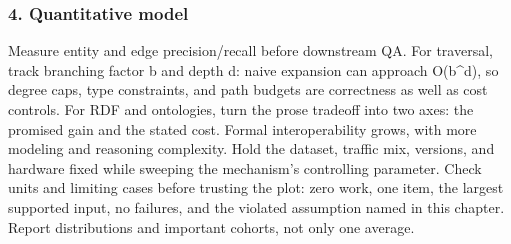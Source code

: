 \subsubsection*{4. Quantitative model}
Measure entity and edge precision/recall before downstream QA. For traversal, track branching factor b and depth d: naive expansion can approach O(b\textasciicircum{}d), so degree caps, type constraints, and path budgets are correctness as well as cost controls.
For RDF and ontologies, turn the prose tradeoff into two axes: the promised gain and the stated cost. Formal interoperability grows, with more modeling and reasoning complexity. Hold the dataset, traffic mix, versions, and hardware fixed while sweeping the mechanism's controlling parameter.
Check units and limiting cases before trusting the plot: zero work, one item, the largest supported input, no failures, and the violated assumption named in this chapter. Report distributions and important cohorts, not only one average.
